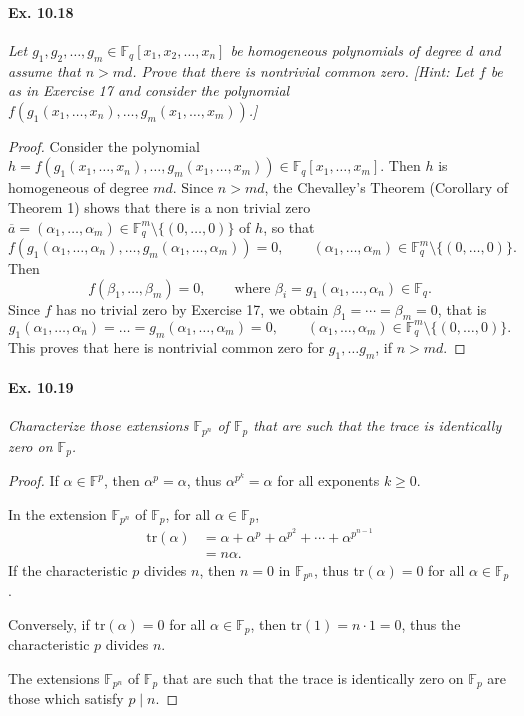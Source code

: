 \documentclass[11pt,a4paper]{article}
\newcommand{\F}{\mathbb{F}}
\begin{document}
\paragraph{Ex. 10.18} {\it Let $g_1,g_2,\ldots,g_m\in \F_q[x_1,x_2,\ldots,x_n]$ be homogeneous polynomials of degree $d$ and assume that $n>md$. Prove that there is nontrivial common zero. [Hint: Let $f$ be as in Exercise 17 and consider the polynomial $f(g_1(x_1,\ldots,x_n),\ldots,g_m(x_1,\ldots,x_m))$.]
}
\begin{proof}
Consider the polynomial $h = f(g_1(x_1,\ldots,x_n),\ldots,g_m(x_1,\ldots,x_m)) \in \F_q[x_1,\ldots,x_m]$. Then $h$ is homogeneous of degree $md$. Since $n > md$, the Chevalley's Theorem (Corollary of Theorem 1) shows that there is a non trivial zero $\overline{a} = (\alpha_1,\ldots,\alpha_m) \in \F_q^m\setminus\{(0,\ldots,0)\}$ of $h$, so that
$$f(g_1(\alpha_1,\ldots,\alpha_n),\ldots,g_m(\alpha_1,\ldots,\alpha_m)) = 0,\qquad (\alpha_1,\ldots,\alpha_m) \in \F_q^m \setminus\{(0,\ldots,0)\}.$$
Then
$$f(\beta_1,\ldots,\beta_m) = 0,\qquad \text{where } \beta_i = g_1(\alpha_1,\ldots,\alpha_n) \in \F_q.$$
Since $f$ has no trivial zero by Exercise 17, we obtain $\beta_1 =\cdots = \beta_m = 0$, that is
$$g_1(\alpha_1,\ldots,\alpha_n)=\ldots =g_m(\alpha_1,\ldots,\alpha_m)=0,\qquad (\alpha_1,\ldots,\alpha_m) \in \F_q^m\setminus\{(0,\ldots,0)\}.$$
This proves that here is nontrivial common zero for $g_1, \ldots g_m$, if $n>md$.
\end{proof}

\paragraph{Ex. 10.19} {\it Characterize those extensions $\F_{p^n}$ of $\F_p$ that are such that the trace is identically zero on $\F_p$.
}
\begin{proof}
If $\alpha \in \F^p$, then $\alpha^p = \alpha$, thus $\alpha^{p^k} = \alpha$ for all exponents $k\geq 0$.

In the extension $\F_{p^n}$ of $\F_p$, for all $\alpha \in \F_p$,
\begin{align*}
\mathrm{tr}(\alpha) &= \alpha + \alpha^p + \alpha^{p^2}+ \cdots + \alpha^{p^{n-1}}\\
&= n \alpha.
\end{align*}
If the characteristic $p$ divides $n$, then $n = 0$ in $\F_{p^n}$, thus $\mathrm{tr}(\alpha) = 0$ for all $\alpha \in \F_p$.

Conversely, if $\mathrm{tr}(\alpha) = 0$ for all $\alpha \in \F_p$, then $\mathrm{tr}(1) = n\cdot 1 = 0$, thus the characteristic $p$ divides $n$.

The extensions $\F_{p^n}$ of $\F_p$ that are such that the trace is identically zero on $\F_p$ are those which satisfy $p \mid n$.


\end{proof}
\end{document}
